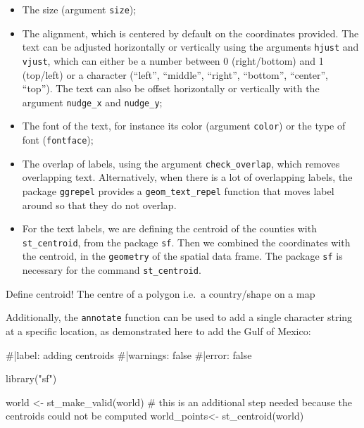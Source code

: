 \documentclass[
  letterpaper,
  DIV=11,
  numbers=noendperiod]{scrartcl}
\newenvironment{Shaded}{\begin{snugshade}}{\end{snugshade}}
\newcommand{\CommentTok}[1]{\textcolor[rgb]{0.37,0.37,0.37}{#1}}
\newcommand{\FunctionTok}[1]{\textcolor[rgb]{0.28,0.35,0.67}{#1}}
\newcommand{\NormalTok}[1]{\textcolor[rgb]{0.00,0.23,0.31}{#1}}
\newcommand{\OtherTok}[1]{\textcolor[rgb]{0.00,0.23,0.31}{#1}}
\newcommand{\StringTok}[1]{\textcolor[rgb]{0.13,0.47,0.30}{#1}}
\providecommand{\tightlist}{%
  \setlength{\itemsep}{0pt}\setlength{\parskip}{0pt}}\usepackage{longtable,booktabs,array}
\begin{document}
\begin{itemize}
\tightlist
\item
  The size (argument \texttt{size});
\item
  The alignment, which is centered by default on the coordinates
  provided. The text can be adjusted horizontally or vertically using
  the arguments \texttt{hjust} and \texttt{vjust}, which can either be a
  number between 0 (right/bottom) and 1 (top/left) or a character
  (``left'', ``middle'', ``right'', ``bottom'', ``center'', ``top'').
  The text can also be offset horizontally or vertically with the
  argument \texttt{nudge\_x} and \texttt{nudge\_y};
\item
  The font of the text, for instance its color (argument \texttt{color})
  or the type of font (\texttt{fontface});
\item
  The overlap of labels, using the argument \texttt{check\_overlap},
  which removes overlapping text. Alternatively, when there is a lot of
  overlapping labels, the package \texttt{ggrepel} provides a
  \texttt{geom\_text\_repel} function that moves label around so that
  they do not overlap.
\item
  For the text labels, we are defining the centroid of the counties with
  \texttt{st\_centroid}, from the package \texttt{sf}. Then we combined
  the coordinates with the centroid, in the \texttt{geometry} of the
  spatial data frame. The package \texttt{sf} is necessary for the
  command \texttt{st\_centroid}.
\end{itemize}

Define centroid! The centre of a polygon i.e.~a country/shape on a map

Additionally, the \texttt{annotate} function can be used to add a single
character string at a specific location, as demonstrated here to add the
Gulf of Mexico:

\begin{Shaded}
\begin{Highlighting}[]
\CommentTok{\#|label: adding centroids}
\CommentTok{\#|warnings: false}
\CommentTok{\#|error: false}

\FunctionTok{library}\NormalTok{(}\StringTok{"sf"}\NormalTok{) }

\NormalTok{world }\OtherTok{\textless{}{-}} \FunctionTok{st\_make\_valid}\NormalTok{(world) }\CommentTok{\# this is an additional step needed because the centroids could not be computed  }
\NormalTok{world\_points}\OtherTok{\textless{}{-}} \FunctionTok{st\_centroid}\NormalTok{(world) }
\end{Highlighting}
\end{Shaded}
\end{document}
